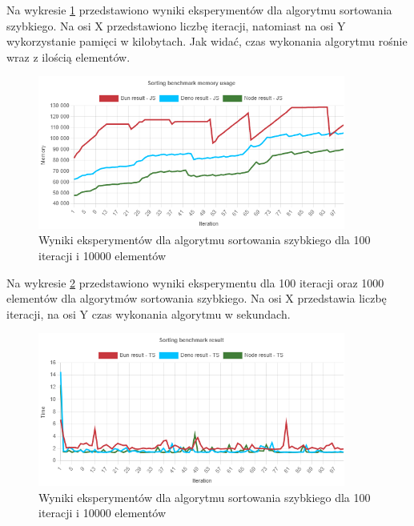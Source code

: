 Na wykresie \ref{fig:radix_sorting_e5_memory_js} przedstawiono wyniki eksperymentów dla algorytmu sortowania szybkiego. Na osi X przedstawiono liczbę iteracji, natomiast na osi Y wykorzystanie pamięci w kilobytach. Jak widać, czas wykonania algorytmu rośnie wraz z ilością elementów.
\begin{figure}[H]
  \centering
  \includegraphics[width=0.9\textwidth]{Figures/sorting/radix/e5_memory_js.png}
  \caption{Wyniki eksperymentów dla algorytmu sortowania szybkiego dla 100 iteracji i 10000 elementów}
  \label{fig:radix_sorting_e5_memory_js}
\end{figure}

Na wykresie \ref{fig:radix_sorting_e5_ts} przedstawiono wyniki eksperymentu dla 100 iteracji oraz 1000 elementów dla algorytmów sortowania szybkiego. Na osi X przedstawia liczbę iteracji, na osi Y czas wykonania algorytmu w sekundach. 

\begin{figure}[H]
  \centering
  \includegraphics[width=0.9\textwidth]{Figures/sorting/radix/e5_ts.png}
  \caption{Wyniki eksperymentów dla algorytmu sortowania szybkiego dla 100 iteracji i 10000 elementów}
  \label{fig:radix_sorting_e5_ts}
\end{figure}

